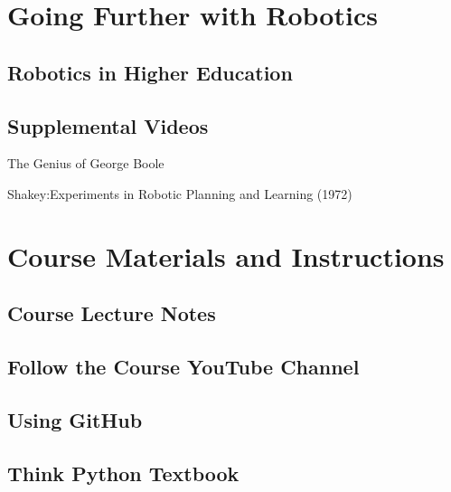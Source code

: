 \documentclass[
]{book}
\begin{document}
\hypertarget{going-further-with-robotics}{%
\chapter{Going Further with Robotics}\label{going-further-with-robotics}}

\hypertarget{robotics-in-higher-education}{%
\section{Robotics in Higher Education}\label{robotics-in-higher-education}}

\hypertarget{supplemental-videos}{%
\section{Supplemental Videos}\label{supplemental-videos}}

The Genius of George Boole

Shakey:Experiments in Robotic Planning and Learning (1972)

\hypertarget{course-materials-and-instructions}{%
\chapter{Course Materials and Instructions}\label{course-materials-and-instructions}}

\hypertarget{course-lecture-notes}{%
\section{Course Lecture Notes}\label{course-lecture-notes}}

\hypertarget{follow-the-course-youtube-channel}{%
\section{Follow the Course YouTube Channel}\label{follow-the-course-youtube-channel}}

\hypertarget{using-github}{%
\section{Using GitHub}\label{using-github}}

\hypertarget{think-python-textbook}{%
\section{Think Python Textbook}\label{think-python-textbook}}
\end{document}
